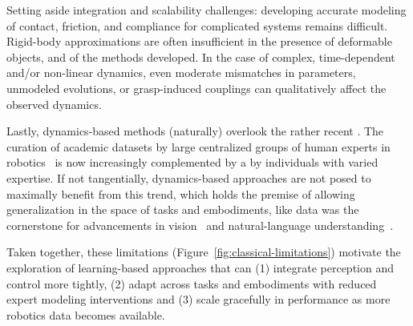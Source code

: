 Setting aside integration and scalability challenges: developing accurate modeling of contact, friction, and compliance for complicated systems remains difficult.
Rigid-body approximations are often insufficient in the presence of deformable objects, and  of the methods developed.
In the case of complex, time-dependent and/or non-linear dynamics, even moderate mismatches in parameters, unmodeled evolutions, or grasp-induced couplings can qualitatively affect the observed dynamics.

Lastly, dynamics-based methods (naturally) overlook the rather recent . 
The curation of academic datasets by large centralized groups of human experts in robotics~\citep{oneillOpenXEmbodimentRobotic2025, khazatskyDROIDLargeScaleInTheWild2025} is now increasingly complemented by a  by individuals with varied expertise.
If not tangentially, dynamics-based approaches are not posed to maximally benefit from this trend, which holds the premise of allowing generalization in the space of tasks and embodiments, like data was the cornerstone for advancements in vision~\citep{alayracFlamingoVisualLanguage2022} and natural-language understanding~\citep{brownLanguageModelsAre2020}.

Taken together, these limitations (Figure~\ref{fig:classical-limitations}) motivate the exploration of learning-based approaches that can (1) integrate perception and control more tightly, (2) adapt across tasks and embodiments with reduced expert modeling interventions and (3) scale gracefully in performance as more robotics data becomes available.